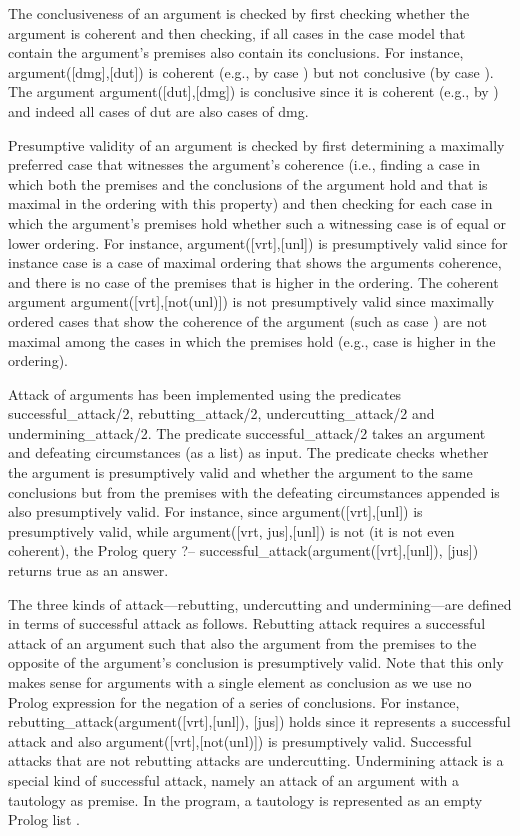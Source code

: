 \documentclass{IOS-Book-Article}
\begin{document}
The conclusiveness of an argument is checked by first checking whether the argument is coherent and then checking, if all cases in the case model that contain the argument's premises also contain its conclusions. For instance, {\mf argument([dmg],[dut])} is coherent (e.g., by case {}) but not conclusive (by case {}). The argument {\mf argument([dut],[dmg])} is conclusive since it is coherent (e.g., by {}) and indeed all cases of {\mf dut} are also cases of {\mf dmg}.

Presumptive validity of an argument is checked by first determining a maximally preferred case that witnesses the argument's coherence (i.e., finding a case in which both the premises and the conclusions of the argument hold and that is maximal in the ordering with this property) and then checking for each case in which the argument's premises hold whether such a witnessing case is of equal or lower ordering. For instance, {\mf argument([vrt],[unl])} is presumptively valid since for instance case {} is a case of maximal ordering that shows the arguments coherence, and there is no case of the premises that is higher in the ordering. The coherent argument {\mf argument([vrt],[not(unl)])} is not presumptively valid since maximally ordered cases that show the coherence of the argument (such as case {}) are not maximal among the cases in which the premises hold (e.g., case {} is higher in the ordering).

Attack of arguments has been implemented using the predicates {\mf successful\_attack/2}, {\mf rebutting\_attack/2}, {\mf undercutting\_attack/2} and {\mf undermining\_attack/2}. The predicate {\mf successful\_attack/2} takes an argument and defeating circumstances (as a list) as input. The predicate checks whether the argument is presumptively valid and whether the argument to the same conclusions but from the premises with the defeating circumstances appended is also presumptively valid. For instance, since {\mf argument([vrt],[unl])} is presumptively valid, while {\mf argument([vrt, jus],[unl])} is not (it is not even coherent), the Prolog query {\mf ?-- successful\_attack(argument([vrt],[unl]), [jus])} returns {\mf true} as an answer.

The three kinds of attack---rebutting, undercutting and undermining---are defined in terms of successful attack as follows. Rebutting attack requires a successful attack of an argument such that also the argument from the premises to the opposite of the argument's conclusion is presumptively valid. Note that this only makes sense for arguments with a single element as conclusion as we use no Prolog expression for the negation of a series of conclusions. For instance, {\mf rebutting\_attack(argument([vrt],[unl]), [jus])} holds since it represents a successful attack and also argument([vrt],[not(unl)]) is presumptively valid. Successful attacks that are not rebutting attacks are undercutting. Undermining attack is a special kind of successful attack, namely an attack of an argument with a tautology as premise. In the program, a tautology is represented as an empty Prolog list {\mf [ ]}.
\end{document}
